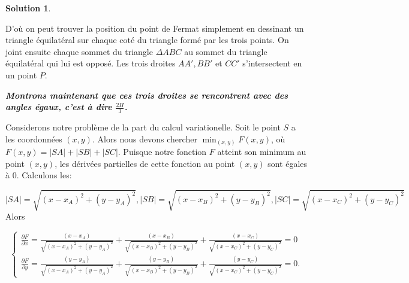 \documentclass[10pt,a4paper]{article}%
\theoremstyle{theorem}
\theoremstyle{definition}
\newtheorem*{solution*}{Solution}
\begin{document}
\begin{solution*}
        	\begin{figure}[h]
        		\begin{center}
	        \end{center}
        	\caption{}\label{poinF2}
        	\end{figure}
       		D'où on peut trouver la position du point de Fermat simplement en dessinant un triangle équilatéral sur chaque coté du triangle formé par les trois points. On joint ensuite chaque sommet du triangle $\Delta ABC$ au sommet du triangle équilatéral qui lui est opposé. Les trois droites $AA',BB'$ et $CC'$ s'intersectent en un point $P$.
        
       		\textbf{\textit{Montrons maintenant que ces trois droites se rencontrent avec des angles égaux, c'est à dire $\frac{2\Pi}{3}$. }}
        
        	Considerons notre problème de la part du calcul variationelle. Soit le point $S$ a les coordonnées $(x,y)$. Alors nous devons chercher $\min_{(x,y)} F(x,y)$, où $F(x,y)=|SA|+|SB|+|SC|$. Puisque notre fonction $F$ atteint son minimum au point $(x,y)$, les dérivées partielles de cette fonction au point $(x,y)$ sont égales à 0. Calculons les:
        
        	\[|SA|=\sqrt{(x-x_A)^2+(y-y_A)^2}, |SB|=\sqrt{(x-x_B)^2+(y-y_B)^2}, |SC|=\sqrt{(x-x_C)^2+(y-y_C)^2}\]
        	Alors
        
        	\begin{equation*}
        		\begin{cases}
		        \frac{\partial F}{\partial x}=\frac{(x-x_A)}{\sqrt{(x-x_A)^2+(y-y_A)^2}}+\frac{(x-x_B)}{\sqrt{(x-x_B)^2+(y-y_B)^2}}+\frac{(x-x_C)}{\sqrt{(x-x_C)^2+(y-y_C)^2}}=0
        		\\
		        \frac{\partial F}{\partial y}=\frac{(y-y_A)}{\sqrt{(x-x_A)^2+(y-y_A)^2}}+\frac{(y-y_B)}{\sqrt{(x-x_B)^2+(y-y_B)^2}}+\frac{(y-y_C)}{\sqrt{(x-x_C)^2+(y-y_C)^2}}=0.
        		\end{cases}
        	\end{equation*}
        

\end{solution*}
\end{document}

